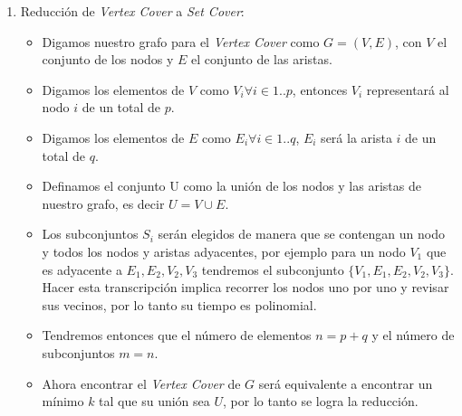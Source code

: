 \documentclass[spanish, fleqn]{article}
\begin{document}
\begin{enumerate}
	\item
		Reducción de \emph{Vertex Cover} a \emph{Set Cover}:
		\begin{itemize}
			\item
				Digamos nuestro grafo para el \emph{Vertex Cover} como $G = (V,
				E)$, con $V$ el conjunto de los nodos y $E$ el conjunto de las
				aristas.
			\item
				Digamos los elementos de $V$ como $V_i \forall i \in 1..p$, 
				entonces $V_i$ representará al nodo $i$ de un total de $p$.
			\item
				Digamos los elementos de $E$ como $E_i \forall i \in 1..q$, 
				$E_i$ será la arista $i$ de un total de $q$.
			\item
				Definamos el conjunto U como la unión de los nodos y las aristas
				de nuestro grafo, es decir $ U = V \cup E $. 
			\item
				Los subconjuntos $S_i$ serán elegidos de manera que se contengan
				un nodo y todos los nodos y aristas adyacentes, por ejemplo para
				un nodo $V_1$ que es adyacente a $E_1, E_2, V_2, V_3$ tendremos
				el subconjunto $\{V_1, E_1, E_2, V_2, V_3\}$. Hacer esta
				transcripción implica recorrer los nodos uno por uno y revisar
				sus vecinos, por lo tanto su tiempo es polinomial.
			\item
				Tendremos entonces que el número de elementos $n = p+q$ y el
				número de subconjuntos $m=n$.
			\item
				Ahora encontrar el \emph{Vertex Cover} de $G$ será equivalente a
				encontrar un mínimo $k$ tal que su unión sea $U$, por lo tanto
				se logra la reducción.
		\end{itemize}


\end{enumerate}
\end{document}
